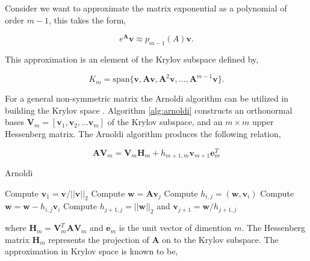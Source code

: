 Consider we want to approximate the matrix exponential as a polynomial of order $m-1$, this takes the form,

\begin{equation}
    e^{\boldsymbol{A}}\boldsymbol{v} \approx p_{m-1}(A)\boldsymbol{v}.
    \label{eq:expPolynomailForm}
\end{equation}

\noindent This approximation is an element of the Krylov subspace defined by,

\begin{equation}
    K_{m} = \text{span}\{\boldsymbol{v}, \boldsymbol{A}\boldsymbol{v}, \boldsymbol{A}^{2}\boldsymbol{v}, ... ,\boldsymbol{A}^{m-1}\boldsymbol{v}\}.
\end{equation}

\noindent For a general non-symmetric matrix the Arnoldi algorithm can be utilized in building the Krylov space \cite{saad1992} \cite{saad1989}. Algorithm \ref{alg:arnoldi} constructs an orthonormal bases $\boldsymbol{V}_{m} = [\boldsymbol{v}_{1}, \boldsymbol{v}_{2}, ... \boldsymbol{v}_{m}]$ of the Krylov subspace, and an $m \times m$ upper Hessenberg matrix. The Arnoldi algorithm produces the following relation,

\begin{equation}
    \boldsymbol{A}\boldsymbol{V}_{m} = \boldsymbol{V}_{m}\boldsymbol{H}_{m} + h_{m+1,m}\boldsymbol{v}_{m+1}\boldsymbol{e}^{T}_{m}
    \label{eq:arnoldiResult}
\end{equation}

\begin{algorithm}
	\caption{Arnoldi} 
	\begin{algorithmic}[1]
	    \State Compute $\boldsymbol{v}_{1} = \boldsymbol{v}/||\boldsymbol{v}||_{2}$
            \State Compute $\boldsymbol{w} = \boldsymbol{A}\boldsymbol{v}_{j}$
                \State Compute $h_{i,j} = (\boldsymbol{w},\boldsymbol{v}_{i})$
                \State Compute $\boldsymbol{w} = \boldsymbol{w} - h_{i,j}\boldsymbol{v}_{i}$
            \EndFor
            \State Compute $h_{j+1, j} = ||\boldsymbol{w}||_{2}$ and $\boldsymbol{v}_{j+1} = \boldsymbol{w}/h_{j+1,j}$
		\EndFor
	\end{algorithmic} 
	\label{alg:arnoldi}
\end{algorithm}

\noindent where $\boldsymbol{H}_{m} = \boldsymbol{V}^{T}_{m}\boldsymbol{A}\boldsymbol{V}_{m}$ and $\boldsymbol{e}_{m}$ is the unit vector of dimention $m$. The Hessenberg matrix $\boldsymbol{H}_{m}$ represents the projection of $\boldsymbol{A}$ on to the Krylov subspace. The approximation in Krylov space is known to be, 

